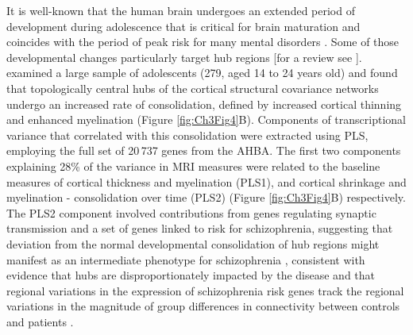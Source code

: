 It is well-known that the human brain undergoes an extended period of development during adolescence that is critical for brain maturation and coincides with the period of peak risk for many mental disorders \citep{Paus2008}. Some of those developmental changes particularly target hub regions \citep{Dennis2013,Hwang2013,Baker2015a} [for a review see \citep{Cao2016}]. 
\citet{Whitaker2016a} examined a large sample of adolescents (279, aged 14 to 24 years old) and found that topologically central hubs of the cortical structural covariance networks undergo an increased rate of consolidation, defined by increased cortical thinning and enhanced myelination (Figure \ref{fig:Ch3Fig4}B).
Components of transcriptional variance that correlated with this consolidation were extracted using PLS, employing the full set of 20\,737 genes from the AHBA. The first two components explaining 28\% of the variance in MRI measures were related to the baseline measures of cortical thickness and myelination (PLS1), and cortical shrinkage and myelination - consolidation over time (PLS2) (Figure \ref{fig:Ch3Fig4}B) respectively. 
The PLS2 component involved contributions from genes regulating synaptic transmission and a set of genes linked to risk for schizophrenia, suggesting that deviation from the normal developmental consolidation of hub regions might manifest as an intermediate phenotype for schizophrenia \citep{Whitaker2016a}, consistent with evidence that hubs are disproportionately impacted by the disease \citep{VanDenHeuvel2013,Crossley2014,Klauser2016} and that regional variations in the expression of schizophrenia risk genes track the regional variations in the magnitude of group differences in connectivity between controls and patients \citep{Romme2017}. 

